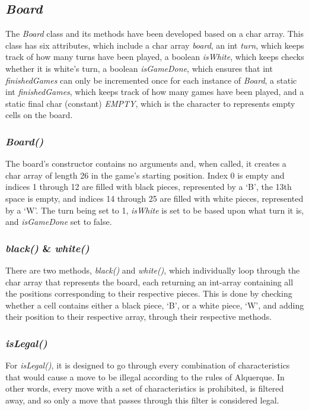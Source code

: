 \documentclass[12pt, a4paper]{article}
\begin{document}
\subsection{\emph{Board}}
The \emph{Board} class and its methods have been developed based on a char array. This class has six attributes, which include a char array \emph{board}, an int \emph{turn}, which keeps track of how many turns have been played, a boolean \emph{isWhite}, which keeps checks whether it is white’s turn, a boolean \emph{isGameDone}, which ensures that int \emph{finishedGames} can only be incremented once for each instance of \emph{Board}, a static int \emph{finishedGames}, which keeps track of how many games have been played, and a static final char (constant) \emph{EMPTY}, which is the character to represents empty cells on the board.

\subsubsection{\emph{Board()}}
The board's constructor contains no arguments and, when called, it creates a char array of length 26 in the game's starting position. Index 0 is empty and indices 1 through 12 are filled with black pieces, represented by a ‘B’, the 13th space is empty, and indices 14 through 25 are filled with white pieces, represented by a ‘W’. The turn being set to 1, \emph{isWhite} is set to be based upon what turn it is, and \emph{isGameDone} set to false. 

\subsubsection{ \emph{black()} \& \emph{white()}}
There are two methods, \emph{black()} and \emph{white()}, which individually loop through the char array that represents the board, each returning an int-array containing all the positions corresponding to their respective pieces. This is done by checking whether a cell contains either a black piece, ‘B’, or a white piece, ‘W’, and adding their position to their respective array, through their respective methods.

\subsubsection{\emph{isLegal()}}
For \emph{isLegal()}, it is designed to go through every combination of characteristics that would cause a move to be illegal according to the rules of Alquerque. In other words, every move with a set of characteristics is prohibited, is filtered away, and so only a move that passes through this filter is considered legal.
\end{document}

